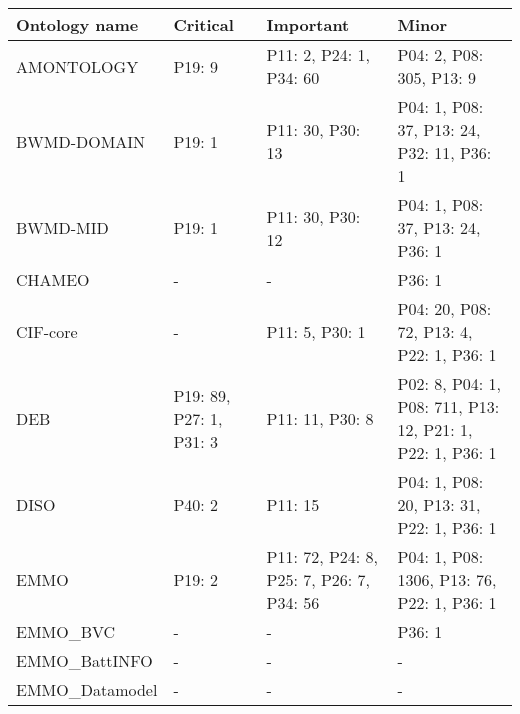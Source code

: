 \begin{tabular}{m{4cm}m{3cm}m{3cm}m{5cm}}
\toprule
          Ontology name &                Critical &                                                Important &                                                      Minor \\
\midrule
             AMONTOLOGY &                  P19: 9 &                                  P11: 2, P24: 1, P34: 60 &                                   P04: 2, P08: 305, P13: 9 \\
            BWMD-DOMAIN &                  P19: 1 &                                         P11: 30, P30: 13 &                  P04: 1, P08: 37, P13: 24, P32: 11, P36: 1 \\
               BWMD-MID &                  P19: 1 &                                         P11: 30, P30: 12 &                           P04: 1, P08: 37, P13: 24, P36: 1 \\
                 CHAMEO &                       - &                                                        - &                                                     P36: 1 \\
               CIF-core &                       - &                                           P11: 5, P30: 1 &                   P04: 20, P08: 72, P13: 4, P22: 1, P36: 1 \\
                    DEB & P19: 89, P27: 1, P31: 3 &                                          P11: 11, P30: 8 &  P02: 8, P04: 1, P08: 711, P13: 12, P21: 1, P22: 1, P36: 1 \\
                   DISO &                  P40: 2 &                                                  P11: 15 &                   P04: 1, P08: 20, P13: 31, P22: 1, P36: 1 \\
                   EMMO &                  P19: 2 &                 P11: 72, P24: 8, P25: 7, P26: 7, P34: 56 &                 P04: 1, P08: 1306, P13: 76, P22: 1, P36: 1 \\
               EMMO_BVC &                       - &                                                        - &                                                     P36: 1 \\
          EMMO_BattINFO &                       - &                                                        - &                                                          - \\
         EMMO_Datamodel &                       - &                                                        - &                                                          - \\

\end{tabular}
